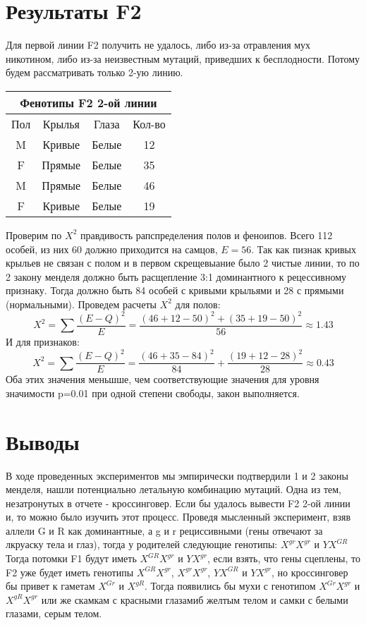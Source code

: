 \documentclass[12pt,a4paper]{article}
\begin{document}
\section{Результаты F2}
Для первой линии F2 получить не удалось, либо из-за отравления мух никотином, либо из-за неизвестным мутаций, приведших к бесплодности. Потому будем рассматривать только 2-ую линию.
\begin{center}
    \begin{tabular}{|c|c|c|c|}  \hline
        \multicolumn{4}{|c|}{Фенотипы F2 2-ой линии} \\ \hline
        Пол & Крылья  & Глаза   & Кол-во \\ \hline
        M   & Кривые  & Белые   & 12 \\ \hline
        F   & Прямые  & Белые   & 35 \\ \hline
        M   & Прямые  & Белые   & 46 \\ \hline
        F   & Кривые  & Белые   & 19 \\ \hline
    \end{tabular}
\end{center}
Проверим по $X^2$ правдивость рапспределения полов и феноипов.
Всего 112 особей, из них 60 должно приходится на самцов, $E = 56$. Так как пизнак кривых крыльев не связан с полом и в 
первом скрещевыание было 2 чистые линии, то по 2 закону менделя должно быть расщепление 3:1 доминантного к рецессивному признаку. Тогда должно быть 84 особей 
с кривыми крыльями и 28 с прямыми (нормальными).
Проведем расчеты $X^2$ для полов:
\begin{equation}
    X^2 = \sum \frac{(E-Q)^2}{E} = \frac{(46+12-50)^2 + (35 + 19 - 50)^2}{56} \approx 1.43
\end{equation}
И для признаков:
\begin{equation}
    X^2 = \sum \frac{(E-Q)^2}{E} = \frac{(46+35-84)^2}{84} +\frac{(19+12 -28)^2}{28} \approx 0.43
\end{equation}
Оба этих значения меньшше, чем соответствующие значения для уровня значимости p=0.01 при одной степени свободы, закон выполняется.

\section{Выводы}
В ходе проведенных экспериментов мы эмпирически подтвердили 1 и 2 законы менделя, нашли потенциально летальную комбинацию мутаций.
Одна из тем, незатронутых в отчете - кроссинговер. Если бы удалось вывести F2 2-ой линии и, то можно было изучить этот процесс.
Проведя мысленный эксперимент, взяв аллели G и R как доминантные, а g и r рециссивными (гены отвечают за лкруаску тела и глаз), тогда у родителей следующие генотипы: 
\female $X^{gr}X^{gr}$ и \mars $YX^{GR}$
\newline Тогда потомки F1 будут иметь \female $X^{GR}X^{gr}$ и \mars $YX^{gr}$, если взять, что гены сцеплены, то F2 уже будет иметь генотипы 
\female $X^{GR}X^{gr}$, \female $X^{gr}X^{gr}$, \mars $YX^{GR}$ и \mars $YX^{gr}$, но кроссинговер бы привет к гаметам $X^{Gr}$ и $X^{gR}$.
Тогда появились бы мухи с генотипом $X^{Gr}X^{gr}$ и $X^{gR}X^{gr}$ или же скамкам с красными глазамиб желтым телом и самки с белыми глазами, серым телом.
\end{document}

